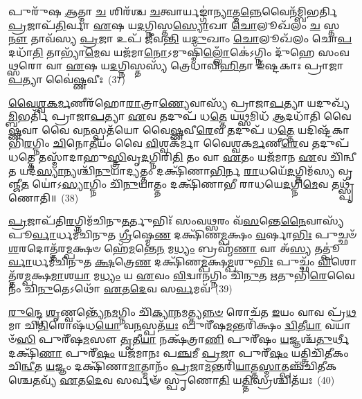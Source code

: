 𑌪𑍁𑌰𑍁᳴𑌷 \ul{𑌆}\-𑌤𑍍𑌮𑌾 \ul{𑌚} 𑌶𑌿𑌰᳴𑌶𑍍𑌚 \ul{𑌚}\-𑌤𑍍𑌵𑌾𑌰𑍍𑌯𑌙𑍍𑌗𑌾॑\-\ul{𑌨𑍍𑌯𑌾}\-𑌤𑍍𑌮\-\ul{𑌨𑍍𑌨𑍇}\-𑌵𑍈𑌨᳴𑌮𑍍𑌬𑌿𑌭𑌰𑍍𑌤𑌿 \ul{𑌪𑍍𑌰}\-𑌜𑌾𑌪᳴\-\ul{𑌤𑌿}\-𑌰𑍍𑌵𑌾 \ul{𑌏}\-𑌷 𑌯\-\ul{𑌦}\-𑌗𑍍𑌨𑌿𑌸𑍍𑌤\-\ul{𑌸𑍍𑌯𑍋}\-𑌖𑌾 \ul{𑌚𑍋}\-𑌲𑍂𑌖᳴𑌲𑌂 \ul{𑌚} 𑌸𑍍𑌤\-\ul{𑌨𑍗} 𑌤𑌾𑌵᳴𑌸𑍍𑌯 \ul{𑌪𑍍𑌰}\-𑌜𑌾 𑌉𑌪᳴ 𑌜𑍀𑌵\-\ul{𑌨𑍍𑌤𑌿} 𑌯\-\ul{𑌦𑍁}\-𑌖𑌾𑌂 \ul{𑌚𑍋}\-𑌲𑍂𑌖᳴𑌲𑌂 𑌚𑍋\-\ul{𑌪}\-𑌦𑌧𑌾᳴\-\ul{𑌤𑌿} 𑌤𑌾𑌭𑍍𑌯𑌾᳴\-\ul{𑌮𑍇}\-𑌵 𑌯𑌜᳴𑌮𑌾\-\ul{𑌨𑍋}\-\-𑌽𑌮𑍁𑌷𑍍𑌮𑌿᳴\-\ul{𑌲𑍍𑌲𑍋𑌁}\-𑌕𑍇॑\-𑌽𑌗𑍍𑌨𑌿𑌂 𑌦𑍁᳴𑌹𑍇 𑌸𑌂𑌵\-\ul{𑌥𑍍𑌸}\-𑌰𑍋 𑌵𑌾 \ul{𑌏}\-𑌷 𑌯\-\ul{𑌦}\-𑌗𑍍𑌨𑌿𑌸𑍍𑌤𑌸𑍍𑌯᳴ 𑌤𑍍𑌰𑍇𑌧𑌾𑌵𑌿\-\ul{𑌹𑌿}\-𑌤𑌾 𑌇᳴𑌷𑍍𑌟𑌕𑌾𑌃 𑌪𑍍𑌰𑌾𑌜𑌾\-\ul{𑌪}\-𑌤𑍍𑌯𑌾 𑌵𑍈॑\-\ul{𑌷𑍍𑌣}\-𑌵𑍀𑌃~(37)

\-\ul{𑌵𑍈}\-\-\ul{𑌶𑍍𑌵}\-\-\ul{𑌕}\-\-\ul{𑌰𑍍𑌮}\-𑌣𑍀𑌰᳴𑌹𑍋\-\ul{𑌰𑌾}\-𑌤𑍍𑌰𑌾\-\ul{𑌣𑍍𑌯𑍇}\-𑌵𑌾𑌸𑍍𑌯᳴ 𑌪𑍍𑌰𑌾𑌜𑌾\-\ul{𑌪}\-𑌤𑍍𑌯𑌾 𑌯𑌦𑍁𑌖𑍍𑌯᳴\-\ul{𑌮𑍍𑌬𑌿}\-𑌭𑌰𑍍𑌤𑌿᳴ 𑌪𑍍𑌰𑌾𑌜𑌾\-\ul{𑌪}\-𑌤𑍍𑌯𑌾 \ul{𑌏}\-𑌵 𑌤𑌦𑍁𑌪᳴ 𑌧\-\ul{𑌤𑍍𑌤𑍇} 𑌯\-\ul{𑌥𑍍𑌸}\-𑌮𑌿𑌧᳴ \ul{𑌆}\-𑌦𑌧𑌾᳴𑌤𑌿 𑌵𑍈\-\ul{𑌷𑍍𑌣}\-𑌵𑌾 𑌵𑍈 𑌵\-\ul{𑌨}\-𑌸𑍍𑌪𑌤᳴𑌯𑍋 𑌵𑍈\-\ul{𑌷𑍍𑌣}\-𑌵𑍀\-\ul{𑌰𑍇}\-𑌵 𑌤𑌦𑍁𑌪᳴ 𑌧\-\ul{𑌤𑍍𑌤𑍇} 𑌯𑌦𑌿𑌷𑍍𑌟᳴𑌕𑌾𑌭𑌿\-\ul{𑌰}\-𑌗𑍍𑌨𑌿𑌂 \ul{𑌚𑌿}\-𑌨𑍋\-\ul{𑌤𑍀}\-𑌯𑌂 𑌵𑍈 \ul{𑌵𑌿}\-𑌶𑍍𑌵𑌕᳴𑌰𑍍𑌮𑌾 𑌵𑍈𑌶𑍍𑌵𑌕\-\ul{𑌰𑍍𑌮}\-𑌣𑍀\-\ul{𑌰𑍇}\-𑌵 𑌤𑌦𑍁𑌪᳴ 𑌧𑌤𑍍𑌤𑍇 𑌤𑌸𑍍𑌮𑌾᳴𑌦𑌾𑌹𑍁\-\ul{𑌸𑍍𑌤𑍍𑌰𑌿}\-𑌵𑍃\-\ul{𑌦}\-𑌗𑍍𑌨𑌿𑌰𑌿\-\ul{𑌤𑌿} 𑌤𑌂 𑌵𑌾 \ul{𑌏}\-𑌤𑌂 𑌯𑌜᳴𑌮𑌾𑌨 \ul{𑌏}\-𑌵 𑌚𑌿᳴𑌨𑍍𑌵𑍀\-\ul{𑌤} 𑌯𑌦᳴\-\ul{𑌸𑍍𑌯𑌾}\-𑌨𑍍𑌯𑌶𑍍𑌚𑌿᳴\-\ul{𑌨𑍁}\-𑌯𑌾𑌦𑍍𑌯𑌤𑍍𑌤𑌂 𑌦𑌕𑍍𑌷𑌿᳴𑌣𑌾\-\ul{𑌭𑌿}\-𑌰𑍍𑌨 \ul{𑌰𑌾}\-𑌧𑌯𑍇᳴\-\ul{𑌦}\-𑌗𑍍𑌨𑌿𑌮᳴𑌸𑍍𑌯 𑌵𑍃𑌞𑍍𑌜𑍀\-\ul{𑌤} 𑌯𑍋॑\-𑌽\-\ul{𑌸𑍍𑌯𑌾}\-𑌗𑍍𑌨𑌿𑌂 𑌚𑌿᳴\-\ul{𑌨𑍁}\-𑌯𑌾𑌤𑍍𑌤𑌂 𑌦𑌕𑍍𑌷𑌿᳴𑌣𑌾𑌭𑍀 𑌰𑌾𑌧𑌯𑍇\-\ul{𑌦}\-𑌗𑍍𑌨𑌿\-\ul{𑌮𑍇}\-𑌵 𑌤𑌥𑍍𑌸𑍍𑌪𑍃᳴𑌣𑍋𑌤𑌿॥~(38)

{\anuvakamend[{\-\ul{𑌷𑍋}\-\-\ul{𑌢𑌾}\-\-\ul{𑌵𑌿}\-\-\ul{𑌹𑌿}\-𑌤𑍋 𑌵𑍈 𑌵𑍈॑\-\ul{𑌷𑍍𑌣}\-𑌵𑍀\-\ul{𑌰}\-𑌨𑍍𑌯𑍋 𑌵𑌿𑍞᳴\-\ul{𑌶}\-𑌤𑌿𑌶𑍍𑌚᳴}]}%

\-\ul{𑌪𑍍𑌰}\-𑌜𑌾𑌪᳴𑌤𑌿\-\ul{𑌰}\-𑌗𑍍𑌨𑌿𑌮᳴𑌚𑌿𑌨𑍁\-\ul{𑌤}\-𑌰𑍍𑌤𑍁𑌭𑌿𑌃᳴ 𑌸𑌂𑌵\-\ul{𑌥𑍍𑌸}\-𑌰𑌂 𑌵᳴\-\ul{𑌸}\-𑌨𑍍𑌤𑍇\-\ul{𑌨𑍈}\-𑌵𑌾𑌸𑍍𑌯᳴ 𑌪𑍂\-\ul{𑌰𑍍𑌵𑌾}\-𑌰𑍍𑌧𑌮᳴𑌚𑌿𑌨𑍁𑌤 \ul{𑌗𑍍𑌰𑍀}\-𑌷𑍍𑌮𑍇\-\ul{𑌣} 𑌦𑌕𑍍𑌷𑌿᳴𑌣\-\ul{𑌮𑍍𑌪}\-𑌕𑍍𑌷𑌂 \ul{𑌵}\-𑌰𑍍\mbox{}𑌷𑌾\-\ul{𑌭𑌿𑌃} 𑌪𑍁𑌚𑍍𑌛𑍞᳴ \ul{𑌶}\-𑌰𑌦𑍋𑌤𑍍𑌤᳴𑌰\-\ul{𑌮𑍍𑌪}\-𑌕𑍍𑌷𑍞 𑌹𑍇᳴\-\ul{𑌮}\-𑌨𑍍𑌤𑍇\-\ul{𑌨} 𑌮\-\ul{𑌧𑍍𑌯𑌂} 𑌬𑍍𑌰𑌹𑍍𑌮᳴\-\ul{𑌣𑌾} 𑌵𑌾 𑌅᳴\-\ul{𑌸𑍍𑌯} 𑌤𑌤𑍍𑌪𑍂॑\-\ul{𑌰𑍍𑌵𑌾}\-𑌰𑍍𑌧𑌮᳴𑌚𑌿𑌨𑍁𑌤 \ul{𑌕𑍍𑌷}\-𑌤𑍍𑌰𑍇\-\ul{𑌣} 𑌦𑌕𑍍𑌷𑌿᳴𑌣\-\ul{𑌮𑍍𑌪}\-𑌕𑍍𑌷\-\ul{𑌮𑍍𑌪}\-𑌶𑍁\-\ul{𑌭𑌿𑌃} 𑌪𑍁𑌚𑍍𑌛𑌂᳴ \ul{𑌵𑌿}\-𑌶𑍋𑌤𑍍𑌤᳴𑌰\-\ul{𑌮𑍍𑌪}\-𑌕𑍍𑌷\-\ul{𑌮𑌾}\-𑌶\-\ul{𑌯𑌾} 𑌮\-\ul{𑌧𑍍𑌯𑌂} 𑌯 \ul{𑌏}\-𑌵𑌂 \ul{𑌵𑌿}\-𑌦𑍍𑌵𑌾\-\ul{𑌨}\-𑌗𑍍𑌨𑌿𑌂 𑌚𑌿᳴\-\ul{𑌨𑍁}\-𑌤 \ul{𑌋}\-𑌤𑍁𑌭𑌿᳴\-\ul{𑌰𑍇}\-𑌵𑍈𑌨𑌂᳴ 𑌚𑌿\-\ul{𑌨𑍁}\-𑌤𑍇\-𑌽𑌥𑍋᳴ \ul{𑌏}\-𑌤\-\ul{𑌦𑍇}\-𑌵 𑌸\-\ul{𑌰𑍍𑌵}\-𑌮𑌵᳴~(39)

\-\ul{𑌰𑍁}\-\-\ul{𑌨𑍍𑌦𑍍𑌧𑍇} \ul{𑌶𑍃}\-𑌣𑍍𑌵𑌨𑍍𑌤𑍍𑌯𑍇᳴𑌨\-\ul{𑌮}\-𑌗𑍍𑌨𑌿𑌂 𑌚𑌿᳴\-\ul{𑌕𑍍𑌯𑌾}\-𑌨𑌮𑌤𑍍𑌤𑍍𑌯\-\ul{𑌨𑍍𑌨}\-\-\ul{𑍞} 𑌰𑍋𑌚᳴𑌤 \ul{𑌇}\-𑌯𑌂 𑌵𑌾𑌵 𑌪𑍍𑌰᳴\-\ul{𑌥}\-𑌮𑌾 𑌚𑌿\-\ul{𑌤𑌿}\-𑌰𑍋𑌷᳴𑌧\-\ul{𑌯𑍋} 𑌵\-\ul{𑌨}\-𑌸𑍍𑌪𑌤᳴\-\ul{𑌯𑌃} 𑌪𑍁𑌰𑍀᳴𑌷\-\ul{𑌮}\-𑌨𑍍𑌤𑌰𑌿᳴𑌕𑍍𑌷𑌂 \ul{𑌦𑍍𑌵𑌿}\-𑌤𑍀\-\ul{𑌯𑌾} 𑌵𑌯𑌾𑍞᳴\-\ul{𑌸𑌿} 𑌪𑍁𑌰𑍀᳴𑌷\-\ul{𑌮}\-𑌸𑍗 \ul{𑌤𑍃}\-𑌤𑍀\-\ul{𑌯𑌾} 𑌨𑌕𑍍𑌷᳴𑌤𑍍𑌰𑌾\-\ul{𑌣𑌿} 𑌪𑍁𑌰𑍀᳴𑌷𑌂 \ul{𑌯}\-𑌜𑍍𑌞𑌶𑍍𑌚᳴\-\ul{𑌤𑍁}\-𑌰𑍍𑌥𑍀 𑌦𑌕𑍍𑌷𑌿᳴\-\ul{𑌣𑌾} 𑌪𑍁𑌰𑍀᳴\-\ul{𑌷𑌂} 𑌯𑌜᳴𑌮𑌾𑌨𑌃 𑌪\-\ul{𑌞𑍍𑌚}\-𑌮𑍀 \ul{𑌪𑍍𑌰}\-𑌜𑌾 𑌪𑍁𑌰𑍀᳴\-\ul{𑌷𑌂} 𑌯𑌤𑍍𑌤𑍍𑌰𑌿𑌚𑌿᳴𑌤𑍀𑌕𑌂 𑌚𑌿\-\ul{𑌨𑍍𑌵𑍀}\-𑌤 \ul{𑌯}\-𑌜𑍍𑌞𑌂 𑌦𑌕𑍍𑌷𑌿᳴𑌣𑌾\-\ul{𑌮𑌾}\-𑌤𑍍𑌮𑌾𑌨𑌂᳴ \ul{𑌪𑍍𑌰}\-𑌜𑌾\-\ul{𑌮}\-𑌨𑍍𑌤𑌰𑌿᳴\-\ul{𑌯𑌾}\-𑌤𑍍𑌤\-\ul{𑌸𑍍𑌮𑌾}\-𑌤𑍍𑌪𑌞𑍍𑌚᳴𑌚𑌿𑌤𑍀𑌕𑌶𑍍𑌚𑍇\-\ul{𑌤}\-𑌵𑍍𑌯᳴ \ul{𑌏}\-𑌤\-\ul{𑌦𑍇}\-𑌵 𑌸𑌰𑍍𑌵𑍟᳴ 𑌸𑍍𑌪𑍃𑌣𑍋\-\ul{𑌤𑌿} 𑌯\-\ul{𑌤𑍍𑌤𑌿}\-𑌸𑍍𑌰𑌶𑍍𑌚𑌿𑌤᳴𑌯𑌃~(40)

